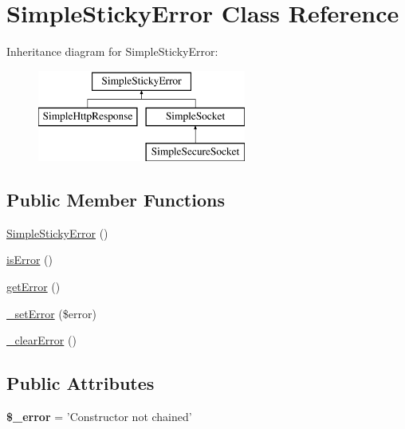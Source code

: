 \hypertarget{class_simple_sticky_error}{
\section{SimpleStickyError Class Reference}
\label{class_simple_sticky_error}
}
Inheritance diagram for SimpleStickyError:\begin{figure}[H]
\begin{center}
\leavevmode
\includegraphics[height=3.000000cm]{class_simple_sticky_error}
\end{center}
\end{figure}
\subsection*{Public Member Functions}
\begin{DoxyCompactItemize}
\item 
\hyperlink{class_simple_sticky_error_aedb79c147da7f14e9ec87f9a4059d30c}{SimpleStickyError} ()
\item 
\hyperlink{class_simple_sticky_error_a37e83b42c631c9650c2920913d0b0bc3}{isError} ()
\item 
\hyperlink{class_simple_sticky_error_a377b1930966cc852d9572445485a7471}{getError} ()
\item 
\hyperlink{class_simple_sticky_error_abbb02ba21c518eacef14ad26dbd07147}{\_\-setError} (\$error)
\item 
\hyperlink{class_simple_sticky_error_aeb95775c3c9b3a66a3292838a86c6bbc}{\_\-clearError} ()
\end{DoxyCompactItemize}
\subsection*{Public Attributes}
\begin{DoxyCompactItemize}
\item 
\hypertarget{class_simple_sticky_error_ab5f008ca03ebcf3e293e9924412dbc6a}{
{\bfseries \$\_\-error} = 'Constructor not chained'}
\label{class_simple_sticky_error_ab5f008ca03ebcf3e293e9924412dbc6a}

\end{DoxyCompactItemize}



